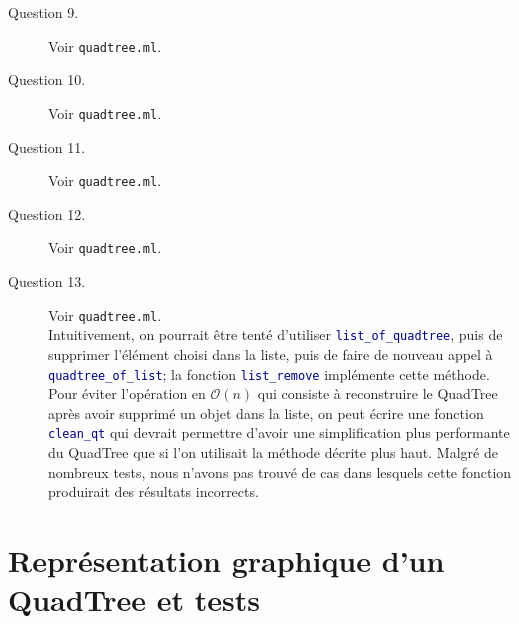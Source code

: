 \documentclass[11pt]{scrartcl}
\newcommand{\funname}[1]{\texttt{\textcolor{darkblue}{#1}}}
\newcommand{\filename}[1]{\texttt{\textcolor{darkbrown}{#1}}}
\begin{document}
\begin{description}
\item[Question 9.] Voir \filename{quadtree.ml}.

\item[Question 10.] Voir \filename{quadtree.ml}.

\item[Question 11.] Voir \filename{quadtree.ml}.

\item[Question 12.] Voir \filename{quadtree.ml}.

\item[Question 13.] Voir \filename{quadtree.ml}.\\
Intuitivement, on pourrait être tenté d'utiliser \funname{list_of_quadtree}, puis de supprimer l'élément choisi dans la liste, puis de faire de nouveau appel à \funname{quadtree_of_list}; la fonction \funname{list_remove} implémente cette méthode.\\
Pour éviter l'opération en $\mathcal{O}(n)$ qui consiste à reconstruire le QuadTree après avoir supprimé un objet dans la liste, on peut écrire une fonction \funname{clean_qt} qui devrait permettre d'avoir une simplification plus performante du QuadTree que si l'on utilisait la méthode décrite plus haut. Malgré de nombreux tests, nous n'avons pas trouvé de cas dans lesquels cette fonction produirait des résultats incorrects.
\end{description}

\section{Représentation graphique d'un QuadTree et tests}
\end{document}
